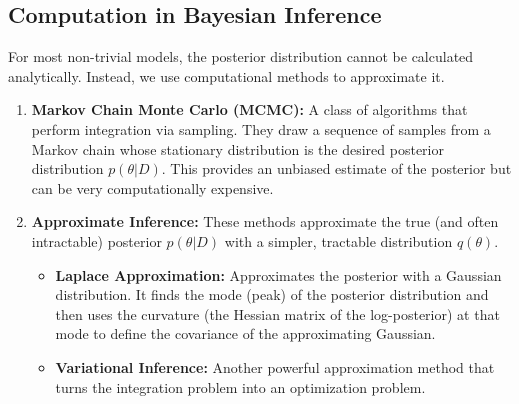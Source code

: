 \documentclass{article}
\begin{document}
\begin{multicols}{2}
	\section{Computation in Bayesian Inference} For most non-trivial models, the posterior distribution cannot be calculated analytically. Instead, we use computational methods to approximate it.
	\begin{enumerate}
		\item \textbf{Markov Chain Monte Carlo (MCMC):} A class of algorithms that perform integration via sampling. They draw a sequence of samples from a Markov chain whose stationary distribution is the desired posterior distribution $p(\theta|D)$. This provides an unbiased estimate of the posterior but can be very computationally expensive.
		\item \textbf{Approximate Inference:} These methods approximate the true (and often intractable) posterior $p(\theta|D)$ with a simpler, tractable distribution $q(\theta)$.
		      \begin{itemize}
			      \item \textbf{Laplace Approximation:} Approximates the posterior with a Gaussian distribution. It finds the mode (peak) of the posterior distribution and then uses the curvature (the Hessian matrix of the log-posterior) at that mode to define the covariance of the approximating Gaussian.
			      \item \textbf{Variational Inference:} Another powerful approximation method that turns the integration problem into an optimization problem.
		      \end{itemize}
	\end{enumerate}

\end{multicols}
\end{document}
